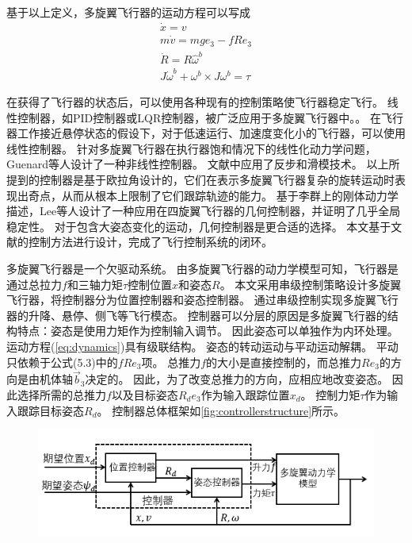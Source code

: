 \documentclass[
  type=master
]{gdutthesis}
\begin{document}
基于以上定义，多旋翼飞行器的运动方程可以写成\vspace{1ex}
\begin{gather}\label{eq:dynamics}
	\dot{x} = v\\
	m\dot{v} = mge_3 - fRe_3\\
	\dot{R} = R\hat{\omega}^b\\
	J\dot{\omega}^b + \omega^b \times J \omega^b = \tau
\end{gather}

在获得了飞行器的状态后，可以使用各种现有的控制策略使飞行器稳定飞行。
线性控制器，如PID控制器或LQR控制器，被广泛应用于多旋翼飞行器中\cite{mechali2022fixed,elkhatem2022robust}。。
在飞行器工作接近悬停状态的假设下，对于低速运行、加速度变化小的飞行器，可以使用线性控制器。
针对多旋翼飞行器在执行器饱和情况下的线性化动力学问题，Guenard等人设计了一种非线性控制器\cite{guenard2005dynamic}。
文献\parencite{bouabdallah2005backstepping}中应用了反步和滑模技术。
以上所提到的控制器是基于欧拉角设计的，它们在表示多旋翼飞行器复杂的旋转运动时表现出奇点，从而从根本上限制了它们跟踪轨迹的能力。
基于李群上的刚体动力学描述，Lee等人设计了一种应用在四旋翼飞行器的几何控制器，并证明了几乎全局稳定性\cite{lee2010geometric}。
对于包含大姿态变化的运动，几何控制器是更合适的选择。
本文基于文献\parencite{lee2010geometric}的控制方法进行设计，完成了飞行控制系统的闭环。


多旋翼飞行器是一个欠驱动系统。
由多旋翼飞行器的动力学模型可知，飞行器是通过总拉力$f$和三轴力矩$\tau$控制位置$x$和姿态$R$。
本文采用串级控制策略设计多旋翼飞行器，将控制器分为位置控制器和姿态控制器。
通过串级控制实现多旋翼飞行器的升降、悬停、侧飞等飞行模态。
控制器可以分层的原因是多旋翼飞行器的结构特点：姿态是使用力矩作为控制输入调节。
因此姿态可以单独作为内环处理。
运动方程(\autoref{eq:dynamics})具有级联结构。
姿态的转动运动与平动运动解耦。
平动只依赖于公式(5.3)中的$fRe_3$项。
总推力$f$的大小是直接控制的，而总推力$Re_3$的方向是由机体轴$\vec{b}_3$决定的。
因此，为了改变总推力的方向，应相应地改变姿态。
因此选择所需的总推力$f$以及目标姿态$R_d e_3$作为输入跟踪位置$x_d$。
控制力矩$\tau$作为输入跟踪目标姿态$R_d$。
控制器总体框架如\autoref{fig:controllerstructure}所示。
\begin{figure}[H]
	\centering
	\includegraphics[width=1.0\textwidth]{屏幕截图 2022-05-05 000516.png}
	\label{fig:controllerstructure}
\end{figure}
\end{document}
